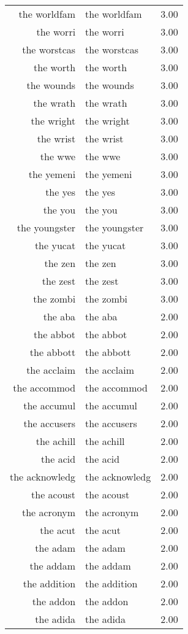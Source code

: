 \begin{table}[ht]
\begin{tabular}{rlr}
  the worldfam & the worldfam & 3.00 \\ 
  the worri & the worri & 3.00 \\ 
  the worstcas & the worstcas & 3.00 \\ 
  the worth & the worth & 3.00 \\ 
  the wounds & the wounds & 3.00 \\ 
  the wrath & the wrath & 3.00 \\ 
  the wright & the wright & 3.00 \\ 
  the wrist & the wrist & 3.00 \\ 
  the wwe & the wwe & 3.00 \\ 
  the yemeni & the yemeni & 3.00 \\ 
  the yes & the yes & 3.00 \\ 
  the you & the you & 3.00 \\ 
  the youngster & the youngster & 3.00 \\ 
  the yucat & the yucat & 3.00 \\ 
  the zen & the zen & 3.00 \\ 
  the zest & the zest & 3.00 \\ 
  the zombi & the zombi & 3.00 \\ 
  the aba & the aba & 2.00 \\ 
  the abbot & the abbot & 2.00 \\ 
  the abbott & the abbott & 2.00 \\ 
  the acclaim & the acclaim & 2.00 \\ 
  the accommod & the accommod & 2.00 \\ 
  the accumul & the accumul & 2.00 \\ 
  the accusers & the accusers & 2.00 \\ 
  the achill & the achill & 2.00 \\ 
  the acid & the acid & 2.00 \\ 
  the acknowledg & the acknowledg & 2.00 \\ 
  the acoust & the acoust & 2.00 \\ 
  the acronym & the acronym & 2.00 \\ 
  the acut & the acut & 2.00 \\ 
  the adam & the adam & 2.00 \\ 
  the addam & the addam & 2.00 \\ 
  the addition & the addition & 2.00 \\ 
  the addon & the addon & 2.00 \\ 
  the adida & the adida & 2.00 \\ 

\end{tabular}
\end{table}
